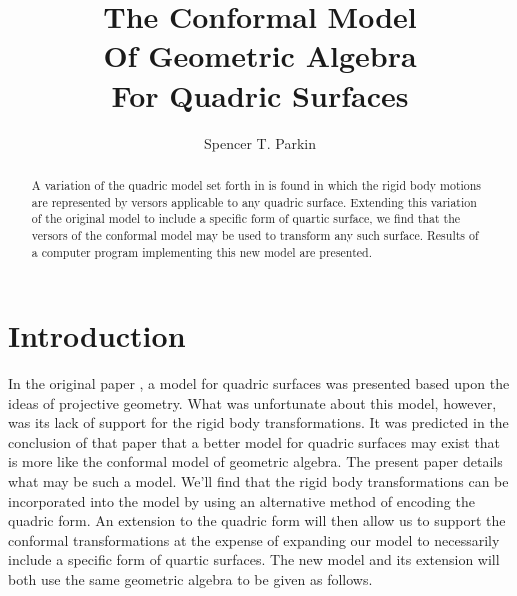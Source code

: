 \documentclass{birkjour}
\theoremstyle{definition}
\theoremstyle{remark}
\numberwithin{equation}{section}
\begin{document}
\title{The Conformal Model\\Of Geometric Algebra\\For Quadric Surfaces}

\author{Spencer T. Parkin}





\begin{abstract}
A variation of the quadric model set forth in \cite{Parkin12} is
found in which the rigid body motions are represented by
versors applicable to any quadric surface.
Extending this variation of the original model to include
a specific form of quartic surface, we find that the versors of
the conformal model may be used to transform any such surface.
Results of a computer program implementing this new model are presented.
\end{abstract}

\maketitle

\section{Introduction}

In the original paper \cite{Parkin12}, a model for quadric surfaces was
presented based upon the ideas of projective geometry.  What was unfortunate
about this model, however, was its lack of support for the rigid body transformations.  It was
predicted in the conclusion of that paper that a better model for quadric
surfaces may exist that is more like the conformal model of geometric algebra.
The present paper details what may be such a model.  We'll find that the rigid
body transformations can be incorporated into the model by using an alternative
method of encoding the quadric form.  An extension to the quadric form
will then allow us to support the conformal transformations at the expense of
expanding our model to necessarily include a specific form of quartic surfaces.  The
new model and its extension will both use the same geometric algebra to be given as follows.
\end{document}
